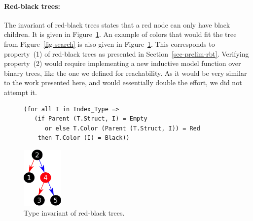 \documentclass{llncs}
\begin{document}
\paragraph{Red-black trees:}
The invariant of red-black trees states that a red node can only have black
children. It is given in Figure~\ref{fig-rbt}. An example of colors that would
fit the tree from Figure~\ref{fig-search} is also given in
Figure~\ref{fig-rbt}.  This corresponds to property~(1) of red-black trees as
presented in Section~\ref{sec-prelim-rbt}. Verifying property~(2) would require
implementing a new inductive model function over binary trees, like the one we
defined for reachability. As it would be very similar to the work presented
here, and would essentially double the effort, we did not attempt it.


\begin{figure}[ht]
\begin{minipage}[c]{.77\linewidth}
\begin{small}
\begin{lstlisting}
(for all I in Index_Type =>
   (if Parent (T.Struct, I) = Empty
      or else T.Color (Parent (T.Struct, I)) = Red
    then T.Color (I) = Black))
\end{lstlisting}
\end{small}
\end{minipage}\hfill
\begin{minipage}[c]{.22\linewidth}
\begin{center}
\includegraphics[width=2cm]{red_black.pdf}
\end{center}
\end{minipage}
\caption{\label{fig-rbt} Type invariant of red-black trees.}
\end{figure}
\end{document}
